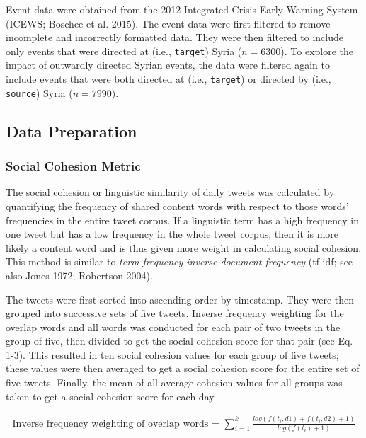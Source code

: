 \documentclass[english,man]{apa6}
\begin{document}
Event data were obtained from the 2012 Integrated Crisis Early Warning System
(ICEWS; Boschee et al. 2015). The event data were first filtered to remove
incomplete and incorrectly formatted data. They were then filtered to include
only events that were directed at (i.e., \texttt{target}) Syria (\(n = 6300\)). To
explore the impact of outwardly directed Syrian events, the data were filtered
again to include events that were both directed at (i.e., \texttt{target}) or directed
by (i.e., \texttt{source}) Syria (\(n = 7990\)).

\hypertarget{data-preparation}{%
\subsection{Data Preparation}\label{data-preparation}}

\hypertarget{social-cohesion-metric}{%
\subsubsection{Social Cohesion Metric}\label{social-cohesion-metric}}

The social cohesion or linguistic similarity of daily tweets was calculated by
quantifying the frequency of shared content words with respect to those words'
frequencies in the entire tweet corpus. If a linguistic term has a high
frequency in one tweet but has a low frequency in the whole tweet corpus, then
it is more likely a content word and is thus given more weight in calculating
social cohesion. This method is similar to \emph{term frequency-inverse document
frequency} (tf-idf; see also Jones 1972; Robertson 2004).

The tweets were first sorted into ascending order by timestamp. They were then
grouped into successive sets of five tweets. Inverse frequency weighting for the
overlap words and all words was conducted for each pair of two tweets in the
group of five, then divided to get the social cohesion score for that pair (see
Eq. 1-3). This resulted in ten social cohesion values for each group of five
tweets; these values were then averaged to get a social cohesion score for the
entire set of five tweets. Finally, the mean of all average cohesion values for
all groups was taken to get a social cohesion score for each day.

\begin{align}
\text{Inverse frequency weighting of overlap words = }\sum_{i=1}^k
\frac{log(f(t_i, d1) + f(t_i, d2) + 1)}{log(f(t_i) + 1)}
\end{align}
\end{document}

